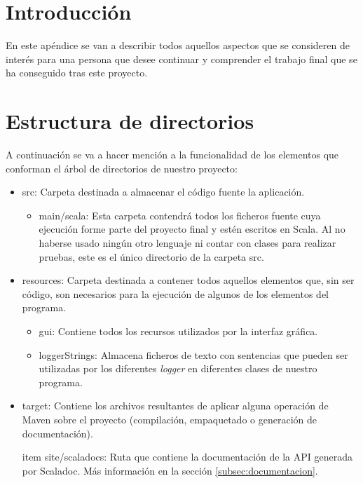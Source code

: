 
\section{Introducción}

En este apéndice se van a describir todos aquellos aspectos que se consideren de interés para una persona que desee continuar y comprender el trabajo final que se ha conseguido tras este proyecto.

\section{Estructura de directorios}

A continuación se va a hacer mención a la funcionalidad de los elementos que conforman el árbol de directorios de nuestro proyecto:

\begin{itemize}
	\item src: Carpeta destinada a almacenar el código fuente la aplicación.
	\begin{itemize}
		\item main/scala: Esta carpeta contendrá todos los ficheros fuente cuya ejecución forme parte del proyecto final y estén escritos en Scala. Al no haberse usado ningún otro lenguaje ni contar con clases para realizar pruebas, este es el único directorio de la carpeta src.
	\end{itemize}
	\item resources: Carpeta destinada a contener todos aquellos elementos que, sin ser código, son necesarios para la ejecución de algunos de los elementos del programa.
	\begin{itemize}
		\item gui: Contiene todos los recursos utilizados por la interfaz gráfica.
		\item loggerStrings: Almacena ficheros de texto con sentencias que pueden ser utilizadas por los diferentes \textit{logger} en diferentes clases de nuestro programa.
	\end{itemize}
	\item target: Contiene los archivos resultantes de aplicar alguna operación de Maven sobre el proyecto (compilación, empaquetado o generación de documentación).
	\begin{itemize}
		item site/scaladocs: Ruta que contiene la documentación de la API generada por Scaladoc. Más información en la sección \ref{subsec:documentacion}.
	\end{itemize}
\end{itemize}

